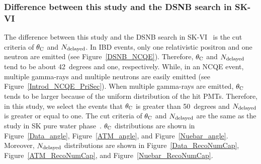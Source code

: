 \subsubsection{Difference between this study and the DSNB search in SK-VI}
\vs\hs
The difference between this study and the DSNB search in SK-VI~\cite{2023Harada} is the cut criteria of $\theta_{{\rm C}}$ and $N_{{\rm delayed}}$.
In IBD events, only one relativistic positron and one neutron are emitted (see Figure~\ref{DSNB_NCQE}).
Therefore, $\theta_{{\rm C}}$ and $N_{{\rm delayed}}$ tend to be about 42~degrees and one, respectively.
While, in an NCQE event, multiple gamma-rays and multiple neutrons are easily emitted (see Figure~\ref{Introd_NCQE_PriSec}).
When multiple gamma-rays are emitted, $\theta_{{\rm C}}$ tends to be larger because of the uniform distribution of the hit PMTs.
Therefore, in this study, we select the events that $\theta_{{\rm C}}$ is greater than 50~degrees and $N_{{\rm delayed}}$ is greater or equal to one.
The cut criteria of $\theta_{{\rm C}}$ and $N_{{\rm delayed}}$ are the same as the study in SK pure water phase~\cite{2019Linyan}.
$\theta_{\rm C}$ distributions are shown in Figure~\ref{Data_angle}, Figure~\ref{ATM_angle}, and Figure~\ref{Nuebar_angle}.
Moreover, $N_{\rm delayed}$ distributions are shown in Figure~\ref{Data_RecoNumCap}, Figure~\ref{ATM_RecoNumCap}, and Figure~\ref{Nuebar_RecoNumCap}.





